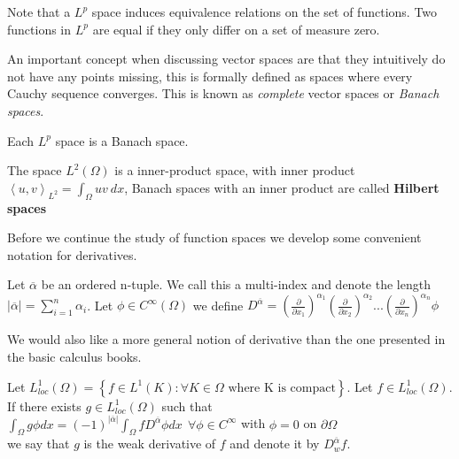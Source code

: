 \documentclass[../Main/main.tex]{subfiles}
\begin{document}
	\begin{remark}
		Note that a $L^p$ space induces equivalence relations on the set of functions. Two functions in $L^p$ are equal if they only differ on a set of measure zero.
	\end{remark}
	An important concept when discussing vector spaces are that they intuitively do not have any points missing, this is formally defined as spaces where every Cauchy sequence converges. This is known as \emph{complete} vector spaces or \emph{Banach spaces}.
	
	\begin{theorem}\label{theorem:Riesz-Fischer}
		Each $L^p$ space is a Banach space.
	\end{theorem}
	\begin{remark}
		The space $L^2(\Omega)$ is a inner-product space, with inner product $\left \langle u,v\right \rangle_{L^2} = \int_{\Omega}uv \ dx$, Banach spaces with an inner product are called \textbf{Hilbert spaces}
	\end{remark}
	
	
	
	
	Before we continue the study of function spaces we develop some convenient notation for derivatives.
	
	\begin{definition}
		Let $\overline{\alpha}$ be an ordered n-tuple. We call this a multi-index and denote the length $|\overline{\alpha}| = \sum_{i=1}^n 		\alpha_i$.
		Let $\phi \in C^{\infty}(\Omega)$ we define $D^{\overline{\alpha}} = (\frac{\partial }{\partial x_1})^{\alpha_1}(\frac{\partial }{\partial x_2})^{\alpha_2}...(\frac{\partial }{\partial x_n})^{\alpha_n}\phi$
	\end{definition}
	
	We would also like a more general notion of derivative than the one presented in the basic calculus books.
	\begin{definition}
		Let $L_{loc}^1(\Omega) =\left \{  \right. f\in L^1(K):\forall K \in \Omega \text{  where K is compact}\left.  \right \}$.
		Let $f \in L_{loc}^1(\Omega)$. If there exists $g\in L_{loc}^1 (\Omega)$ such that \\
		$\int_{\Omega} g \phi dx = (-1)^{|\overline{\alpha}|} \int_{\Omega} f D^{\overline{\alpha}} \phi dx \ \ \forall \phi \in C^{\infty}$ with $\phi = 0$ on $\partial \Omega$ \\ we say that $g$ is the weak derivative of $f$ and denote it by $D_w^{\overline{\alpha}}f$.
	\end{definition}
	
\end{document}
